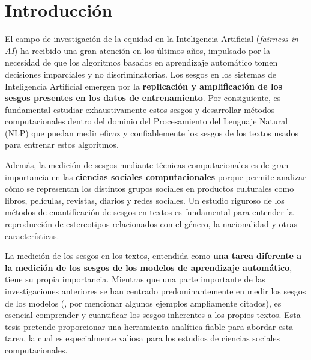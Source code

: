 
\chapter{Introducción} \label{cap:intro}



El campo de investigación de la equidad en la Inteligencia Artificial (\emph{fairness in AI}) ha recibido una gran atención en los últimos años, impulsado por la necesidad de que los algoritmos basados en aprendizaje automático tomen decisiones imparciales y no discriminatorias. Los sesgos en los sistemas de Inteligencia Artificial emergen por la \textbf{replicación y amplificación de los sesgos presentes en los datos de entrenamiento}. Por consiguiente, es fundamental estudiar exhaustivamente estos sesgos y desarrollar métodos computacionales dentro del dominio del Procesamiento del Lenguaje Natural (NLP) que puedan medir eficaz y confiablemente los sesgos de los textos usados para entrenar estos algoritmos. 

Además, la medición de sesgos mediante técnicas computacionales es de gran importancia en las \textbf{ciencias sociales computacionales} porque permite analizar cómo se representan los distintos grupos sociales en productos culturales como libros, películas, revistas, diarios y redes sociales. Un estudio riguroso de los métodos de cuantificación de sesgos en textos es fundamental para entender la reproducción de estereotipos relacionados con el género, la nacionalidad y otras características.

La medición de los sesgos en los textos, entendida como \textbf{una tarea diferente a la medición de los sesgos de los modelos de aprendizaje automático}, tiene su propia importancia. Mientras que una parte importante de las investigaciones anteriores se han centrado predominantemente en medir los sesgos de los modelos (\citealp{bolukbasi2016man,kiritchenko2018examining,zhao2018gender,bordia2019identifying,gonen2019lipstick,lu2020gender,blodgett2020language}, por mencionar algunos ejemplos ampliamente citados), es esencial comprender y cuantificar los sesgos inherentes a los propios textos. Esta tesis pretende proporcionar una herramienta analítica fiable para abordar esta tarea, la cual es especialmente valiosa para los estudios de ciencias sociales computacionales. 

